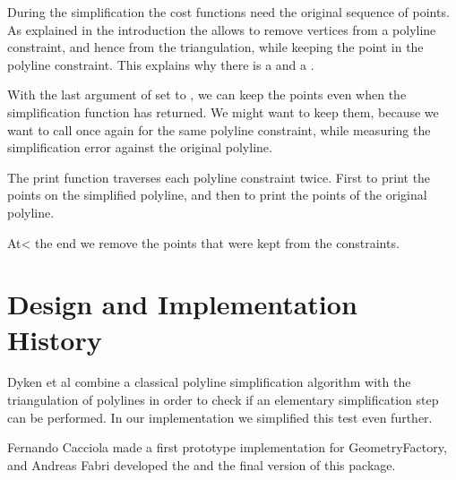 During the simplification the cost functions need the original
sequence of points.  
As explained in the introduction the  allows to remove vertices from a polyline constraint,
and hence from the triangulation, while keeping the
point in the polyline constraint. This explains why there is
a  and a 
.

With the last argument of  set 
to , we can keep the points even when
the simplification function has returned. 
We might want to keep them, 
because we want to call  once again
for the same polyline constraint, while measuring the simplification
error against the original polyline.

The print function traverses each polyline constraint
twice. First to print the points on the simplified polyline, and
then to print the points of the original polyline.

At< the end we remove the points that were kept from the constraints.



\section{Design and Implementation History}

Dyken et al \cite{cgal:dds-scs-09} combine a classical polyline simplification algorithm
with the triangulation of polylines in order to check if an elementary simplification step can be
performed. In our implementation we simplified this test even further. 

Fernando Cacciola made a first prototype implementation for GeometryFactory, and Andreas Fabri
developed the  and the final version of this package.



